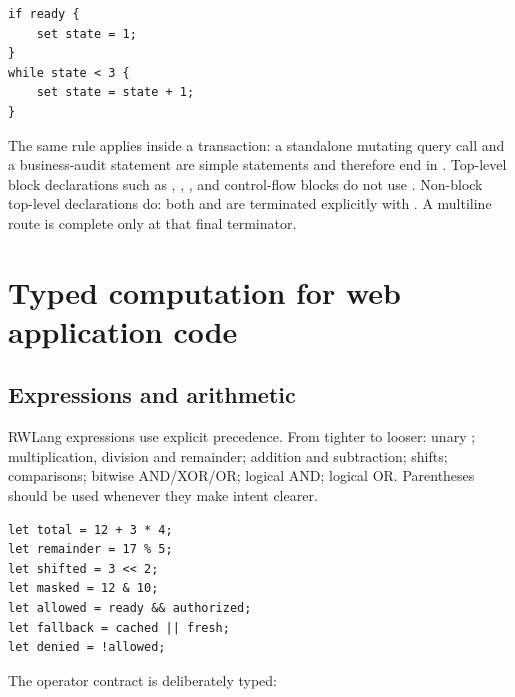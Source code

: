 \begin{lstlisting}[language=RWLang]
if ready {
    set state = 1;
}
while state < 3 {
    set state = state + 1;
}
\end{lstlisting}

The same rule applies inside a transaction: a standalone mutating query call and a business-audit statement are simple statements and therefore end in \code{;}. Top-level block declarations such as , , , and control-flow blocks do not use \code{;}. Non-block top-level declarations do: both  and  are terminated explicitly with \code{;}. A multiline route is complete only at that final terminator.

\section{Typed computation for web application code}

\subsection*{Expressions and arithmetic}

RWLang expressions use explicit precedence. From tighter to looser: unary \code{!}; multiplication, division and remainder; addition and subtraction; shifts; comparisons; bitwise AND/XOR/OR; logical AND; logical OR. Parentheses should be used whenever they make intent clearer.

\begin{lstlisting}[language=RWLang]
let total = 12 + 3 * 4;
let remainder = 17 % 5;
let shifted = 3 << 2;
let masked = 12 & 10;
let allowed = ready && authorized;
let fallback = cached || fresh;
let denied = !allowed;
\end{lstlisting}

The operator contract is deliberately typed:

